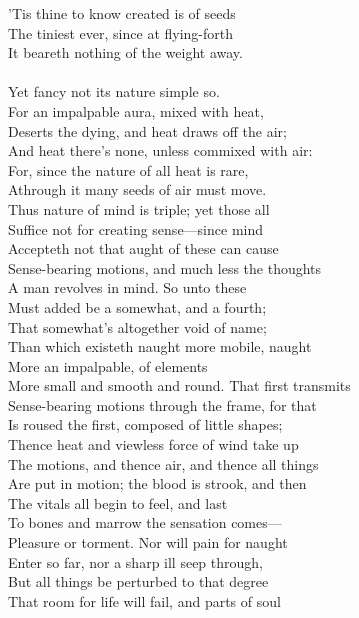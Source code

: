 'Tis thine to know created is of seeds\\
The tiniest ever, since at flying-forth\\
It beareth nothing of the weight away.\\
\\
Yet fancy not its nature simple so.\\
For an impalpable aura, mixed with heat,\\
Deserts the dying, and heat draws off the air;\\
And heat there's none, unless commixed with air:\\
For, since the nature of all heat is rare,\\
Athrough it many seeds of air must move.\\
Thus nature of mind is triple; yet those all\\
Suffice not for creating sense—since mind\\
Accepteth not that aught of these can cause\\
Sense-bearing motions, and much less the thoughts\\
A man revolves in mind. So unto these\\
Must added be a somewhat, and a fourth;\\
That somewhat's altogether void of name;\\
Than which existeth naught more mobile, naught\\
More an impalpable, of elements\\
More small and smooth and round. That first transmits\\
Sense-bearing motions through the frame, for that\\
Is roused the first, composed of little shapes;\\
Thence heat and viewless force of wind take up\\
The motions, and thence air, and thence all things\\
Are put in motion; the blood is strook, and then\\
The vitals all begin to feel, and last\\
To bones and marrow the sensation comes—\\
Pleasure or torment. Nor will pain for naught\\
Enter so far, nor a sharp ill seep through,\\
But all things be perturbed to that degree\\
That room for life will fail, and parts of soul\\
